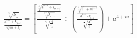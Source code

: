 \documentclass[10pt,a4paper]{book}
\begin{document}
$\frac{\sqrt[^{c_j}]{k_{_m}}}{\frac{x^{^{4+c}}+k_{j+l}}{\sqrt[m^{^4}]{m+k_{_l}}}} = \left[ \frac{\frac{\sqrt[^\frac{k}{m}]{4^{^{m+1}}\div \, l_{m+j}}}{\sqrt[^{k^{m+1}}]{j_{_{m-1}}}}}{\sqrt[^{p_j}]{\frac{4}{l_{_m}}}}\div \left( \frac{\frac{\sqrt[^{k_i}]{i^{^{j\cdot l}}+m^{^{6+x}}}}{h^{^{4+4}}\cdot k_{_{l-1}}}}{\sqrt[^{\frac{1}{m}}]{\frac{4^{^{m}}}{6^{^{n}}}}}\right)+a^{4+m}\right]$
\pagestyle{empty}
\end{document}
